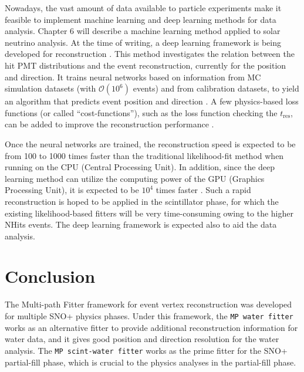 Nowadays, the vast amount of data available to particle experiments make it feasible to implement machine learning and deep learning methods for data analysis. Chapter 6 will describe a machine learning method applied to solar neutrino analysis. At the time of writing, a deep learning framework is being developed for reconstruction \cite{markMachineLearning,markNeuralTalk,markNeuralNetwork}. This method investigates the relation between the hit PMT distributions and the event reconstruction, currently for the position and direction. It trains neural networks based on information from MC simulation datasets (with $\mathcal{O}(10^6)$ events) and from calibration datasets, to yield an algorithm that predicts event position and direction \cite{markNeuralTalk}. A few physics-based loss functions (or called ``cost-functions''), such as the loss function checking the $t_\mathrm{res}$, can be added to improve the reconstruction performance \cite{markNeuralTalk}. 

Once the neural networks are trained, the reconstruction speed is expected to be from 100 to 1000 times faster than the traditional likelihood-fit method when running on the CPU (Central Processing Unit). In addition, since the deep learning method can utilize the computing power of the GPU (Graphics Processing Unit), it is expected to be $10^4$ times faster \cite{markNeuralTalk,markNeuralNetwork}. Such a rapid reconstruction is hoped to be applied in the scintillator phase, for which the existing likelihood-based fitters will be very time-consuming owing to the higher NHits events. The deep learning framework is expected also to aid the data analysis.

\section{Conclusion}

The Multi-path Fitter framework for event vertex reconstruction was developed for multiple SNO+ physics phases. Under this framework, the \texttt{MP water fitter} works as an alternative fitter to provide additional reconstruction information for water data, and it gives good position and direction resolution for the water analysis. The \texttt{MP scint-water fitter} works as the prime fitter for the SNO+ partial-fill phase, which is crucial to the physics analyses in the partial-fill phase.
